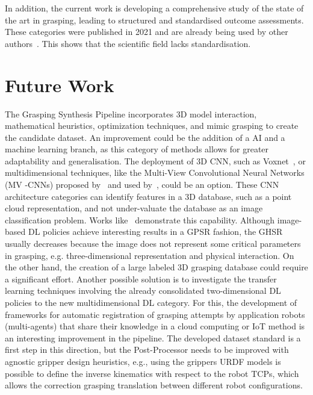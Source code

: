 In addition, the current work is developing a comprehensive study of the state of the art in grasping, leading to structured and standardised outcome assessments. These categories were published in 2021 and are already being used by other authors~\cite{hu2022grasps}. This shows that the scientific field lacks standardisation.

\section{Future Work}

The Grasping Synthesis Pipeline incorporates 3D model interaction, mathematical heuristics, optimization techniques, and mimic grasping to create the candidate dataset. An improvement could be the addition of a AI and a machine learning branch, as this category of methods allows for greater adaptability and generalisation. The deployment of 3D \ac{CNN}, such as Voxnet~\cite{maturana2015voxnet}, or multidimensional techniques, like the Multi-View Convolutional Neural Networks (MV -CNNs) proposed by~\cite{su2015multi} and used by~\cite{Mahler2016}, could be an option. These CNN architecture categories can identify features in a 3D database, such as a point cloud representation, and not under-valuate the database as an image classification problem. Works like~\cite{choi2018learning} demonstrate this capability. Although image-based \ac{DL} policies achieve interesting results in a \ac{GPSR} fashion, the \ac{GHSR} usually decreases because the image does not represent some critical parameters in grasping, e.g. three-dimensional representation and physical interaction. On the other hand, the creation of a large labeled 3D grasping database could require a significant effort. Another possible solution is to investigate the transfer learning techniques involving the already consolidated two-dimensional \ac{DL} policies to the new multidimensional \ac{DL} category. For this, the development of frameworks for automatic registration of grasping attempts by application robots (multi-agents) that share their knowledge in a cloud computing or IoT method is an interesting improvement in the pipeline. The developed dataset standard is a first step in this direction, but the Post-Processor needs to be improved with agnostic gripper design heuristics, e.g., using the grippers URDF models is possible to define the inverse kinematics with respect to the robot \acp{TCP}, which allows the correction grasping translation between different robot configurations. 

